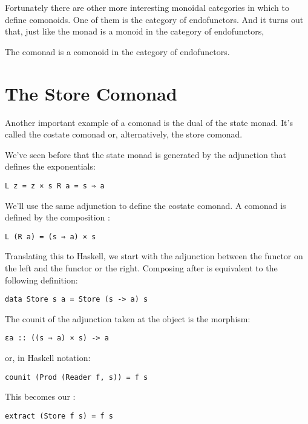 Fortunately there are other more interesting monoidal categories in
which to define comonoids. One of them is the category of endofunctors.
And it turns out that, just like the monad is a monoid in the category
of endofunctors,

The comonad is a comonoid in the category of endofunctors.

\section{The Store Comonad}\label{the-store-comonad}

Another important example of a comonad is the dual of the state monad.
It's called the costate comonad or, alternatively, the store comonad.

We've seen before that the state monad is generated by the adjunction
that defines the exponentials:

\begin{verbatim}
L z = z × s R a = s ⇒ a
\end{verbatim}

We'll use the same adjunction to define the costate comonad. A comonad
is defined by the composition :

\begin{verbatim}
L (R a) = (s ⇒ a) × s
\end{verbatim}

Translating this to Haskell, we start with the adjunction between the
 functor on the left and the  functor or the
right. Composing  after  is equivalent to
the following definition:

\begin{verbatim}
data Store s a = Store (s -> a) s
\end{verbatim}

The counit of the adjunction taken at the object  is the
morphism:

\begin{verbatim}
εa :: ((s ⇒ a) × s) -> a
\end{verbatim}

or, in Haskell notation:

\begin{verbatim}
counit (Prod (Reader f, s)) = f s
\end{verbatim}

This becomes our :

\begin{verbatim}
extract (Store f s) = f s
\end{verbatim}


